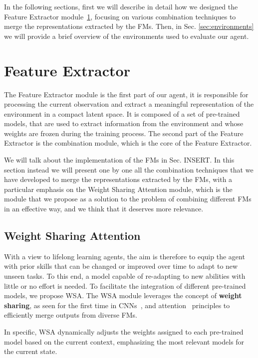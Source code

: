 In the following sections, first we will describe in detail how we designed the Feature Extractor module~\ref{sec:feature_extractor}, focusing on various combination techniques to merge the representations extracted by the FMs.
Then, in Sec. \ref{sec:environments} we will provide a brief overview of the environments used to evaluate our agent.



\section{Feature Extractor} \label{sec:feature_extractor}
The Feature Extractor module is the first part of our agent, it is responsible for processing the current observation and extract a meaningful representation of the environment in a compact latent space.
It is composed of a set of pre-trained models, that are used to extract information from the environment and whose weights are frozen during the training process.
The second part of the Feature Extractor is the combination module, which is the core of the Feature Extractor.

We will talk about the implementation of the FMs in Sec. INSERT.
In this section instead we will present one by one all the combination techniques that we have developed to merge the representations extracted by the FMs, with a particular emphasis on the Weight Sharing Attention module, which is the module that we propose as a solution to the problem of combining different FMs in an effective way, and we think that it deserves more relevance.


\subsection{Weight Sharing Attention}
\label{sec:wsa}

With a view to lifelong learning agents, the aim is therefore to equip the agent with prior skills that can be changed or improved over time to adapt to new unseen tasks.
To this end, a model capable of re-adapting to new abilities with little or no effort is needed.
To facilitate the integration of different pre-trained models, we propose WSA\@.
The WSA module leverages the concept of \textbf{weight sharing}, as seen for the first time in CNNs~\citep{fukushima1980neocognitron}, and attention~\citep{vaswani2017attention} principles to efficiently merge outputs from diverse FMs.

In specific, WSA dynamically adjusts the weights assigned to each pre-trained model based on the current context, emphasizing the most relevant models for the current state.


